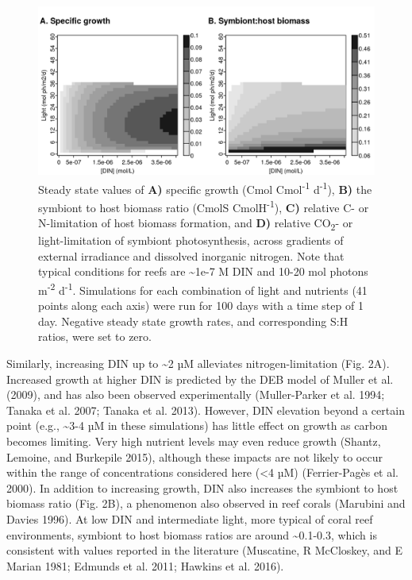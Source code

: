 \documentclass[]{elsarticle} %
\makeatletter
\def\maxwidth{\ifdim\Gin@nat@width>\linewidth\linewidth
\else\Gin@nat@width\fi}
\let\Oldincludegraphics\includegraphics
\renewcommand{\includegraphics}[1]{\Oldincludegraphics[width=\maxwidth]{#1}}
\makeatother
\begin{document}
\begin{figure}[htbp]
\centering
\includegraphics{../img/Fig2.png}
\caption{Steady state values of \textbf{A)} specific growth (Cmol
Cmol\textsuperscript{-1} d\textsuperscript{-1}), \textbf{B)} the
symbiont to host biomass ratio (CmolS CmolH\textsuperscript{-1}),
\textbf{C)} relative C- or N-limitation of host biomass formation, and
\textbf{D)} relative CO\textsubscript{2}- or light-limitation of
symbiont photosynthesis, across gradients of external irradiance and
dissolved inorganic nitrogen. Note that typical conditions for reefs are
\textasciitilde{}1e-7 M DIN and 10-20 mol photons m\textsuperscript{-2}
d\textsuperscript{-1}. Simulations for each combination of light and
nutrients (41 points along each axis) were run for 100 days with a time
step of 1 day. Negative steady state growth rates, and corresponding S:H
ratios, were set to zero.}
\end{figure}

Similarly, increasing DIN up to \textasciitilde{}2 µM alleviates
nitrogen-limitation (Fig. 2A). Increased growth at higher DIN is
predicted by the DEB model of Muller et al. (2009), and has also been
observed experimentally (Muller-Parker et al. 1994; Tanaka et al. 2007;
Tanaka et al. 2013). However, DIN elevation beyond a certain point
(e.g., \textasciitilde{}3-4 µM in these simulations) has little effect
on growth as carbon becomes limiting. Very high nutrient levels may even
reduce growth (Shantz, Lemoine, and Burkepile 2015), although these
impacts are not likely to occur within the range of concentrations
considered here (\textless{}4 µM) (Ferrier-Pagès et al. 2000). In
addition to increasing growth, DIN also increases the symbiont to host
biomass ratio (Fig. 2B), a phenomenon also observed in reef corals
(Marubini and Davies 1996). At low DIN and intermediate light, more
typical of coral reef environments, symbiont to host biomass ratios are
around \textasciitilde{}0.1-0.3, which is consistent with values
reported in the literature (Muscatine, R McCloskey, and E Marian 1981;
Edmunds et al. 2011; Hawkins et al. 2016).
\end{document}
